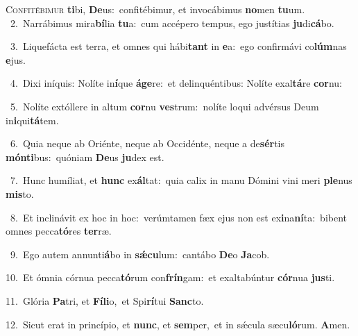 \lettrine{\initial\textcolor{\initialcolor}{C}}{onfitébimur} \textbf{ti}\-bi, \textbf{De}\-us:~\star confitébimur, et invocábimus \textbf{no}\-men \textbf{tu}\-um.\\
{\numbfont\textcolor{\numbcolor}{~2.}}~Narrábimus mira\-\textbf{bí}\-lia \textbf{tu}\-a:~\star cum accépero tempus, ego justítias \textbf{ju}\-di\-\textbf{cá}\-bo.\par
{\numbfont\textcolor{\numbcolor}{~3.}}~Liquefácta est terra, et omnes qui hábi\textbf{tant} in \textbf{e}\-a:~\star ego confirmávi co\-\textbf{lúm}\-nas \textbf{e}\-jus.\par
{\numbfont\textcolor{\numbcolor}{~4.}}~Dixi iníquis: Nolíte in\-\textbf{í}\-que \textbf{á}\-\textbf{ge}re:~\star et delinquéntibus: Nolíte exal\-\textbf{tá}\-re \textbf{cor}\-nu:\par
{\numbfont\textcolor{\numbcolor}{~5.}}~Nolíte extóllere in altum \textbf{cor}\-nu \textbf{ves}\-trum:~\star nolíte loqui advérsus Deum in\-\textbf{i}\-qui\-\textbf{tá}\-tem.\par
{\numbfont\textcolor{\numbcolor}{~6.}}~Quia neque ab Oriénte, neque ab Occidénte, neque a de\-\textbf{sér}\-tis \textbf{món}\-\textbf{ti}bus:~\star quóniam \textbf{De}\-us \textbf{ju}\-dex est.\par
{\numbfont\textcolor{\numbcolor}{~7.}}~Hunc humíliat, et \textbf{hunc} ex\-\textbf{ál}\-tat:~\star quia calix in manu Dómini vini meri \textbf{ple}\-nus \textbf{mis}\-to.\par
{\numbfont\textcolor{\numbcolor}{~8.}}~Et inclinávit ex hoc in hoc:~\dagger verúmtamen fæx ejus non est ex\-\textbf{i}\-na\-\textbf{ní}\-ta:~\star bibent omnes pecca\-\textbf{tó}\-res \textbf{ter}\-ræ.\par
{\numbfont\textcolor{\numbcolor}{~9.}}~Ego autem annunti\-\textbf{á}\-bo in \textbf{sǽ}\-\textbf{cu}lum:~\star cantábo \textbf{De}\-o \textbf{Ja}\-cob.\par
{\numbfont\textcolor{\numbcolor}{10.}}~Et ómnia córnua pecca\-\textbf{tó}\-rum con\-\textbf{frín}\-gam:~\star et exaltabúntur \textbf{cór}\-nua \textbf{jus}\-ti.\par
{\numbfont\textcolor{\numbcolor}{11.}}~Glória \textbf{Pa}\-tri, et \textbf{Fí}\-\textbf{li}o,~\star et Spi\-\textbf{rí}\-tui \textbf{Sanc}\-to.\par
{\numbfont\textcolor{\numbcolor}{12.}}~Sicut erat in princípio, et \textbf{nunc}\-, et \textbf{sem}\-per,~\star et in sǽcula sæcu\-\textbf{ló}\-rum. \textbf{A}\-men.\par
